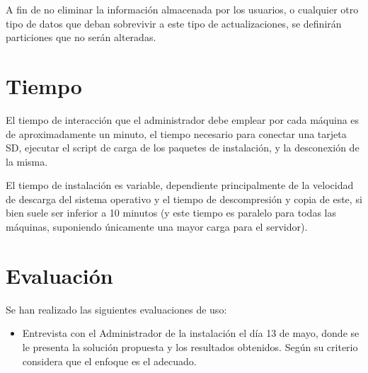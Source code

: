 \documentclass{article}
\begin{document}
A fin de no eliminar la información almacenada por los usuarios, o cualquier otro tipo de datos que deban sobrevivir a este tipo de actualizaciones, se definirán particiones que no serán alteradas.

\section{Tiempo}

El tiempo de interacción que el administrador debe emplear por cada máquina es de aproximadamente un minuto, el tiempo necesario para conectar una tarjeta SD, ejecutar el script de carga de los paquetes de instalación, y la desconexión de la misma.

El tiempo de instalación es variable, dependiente principalmente de la velocidad de descarga del sistema operativo y el tiempo de descompresión y copia de este, si bien suele ser inferior a 10 minutos (y este tiempo es paralelo para todas las máquinas, suponiendo únicamente una mayor carga para el servidor).

\section{Evaluación}

Se han realizado las siguientes evaluaciones de uso:

\begin{itemize}
	\item Entrevista con el Administrador de la instalación el día 13 de mayo, donde se le presenta la solución propuesta y los resultados obtenidos. Según su criterio considera que el enfoque es el adecuado.

\end{itemize}
\nocite{rpiconfig}

 \label{Bibliography}
\end{document}
